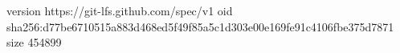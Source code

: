 version https://git-lfs.github.com/spec/v1
oid sha256:d77be6710515a883d468ed5f49f85a5c1d303e00e169fe91c4106fbe375d7871
size 454899
